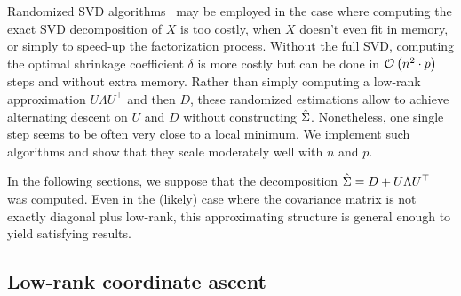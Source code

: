Randomized SVD algorithms~\citep{random_svd} may be employed
in the case where computing the exact SVD decomposition of $X$ is too costly,
when $X$ doesn't even fit in memory,
or simply to speed-up the factorization process.
Without the full SVD, computing the optimal shrinkage coefficient $\delta$ is more costly
but can be done in $\mathcal{O}\left( n^2 \cdot p \right)$ steps and without extra memory.
Rather than simply computing a low-rank approximation $U \Lambda U^\top$ and then $D$,
these randomized estimations allow to achieve alternating descent on $U$ and $D$ without constructing $\hat{\Sigma}$.
Nonetheless, one single step seems to be often very close to a local minimum.
We implement such algorithms and show that they scale moderately well with $n$ and $p$.

\bigbreak
In the following sections,
we suppose that the decomposition $\hat{\Sigma} = D + U \Lambda U^\top$
was computed.
Even in the (likely) case where the covariance matrix is not exactly diagonal plus low-rank,
this approximating structure is general enough to yield satisfying results.

\subsection{Low-rank coordinate ascent}\label{subsec:low_rank_sdp}


